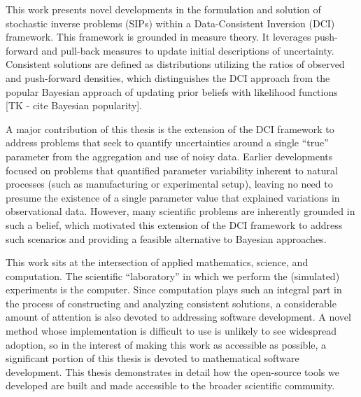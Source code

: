 This work presents novel developments in the formulation and solution of stochastic inverse problems (SIPs) within a Data-Consistent Inversion (DCI) framework.
This framework is grounded in measure theory.
It leverages push-forward and pull-back measures to update initial descriptions of uncertainty.
Consistent solutions are defined as distributions utilizing the ratios of observed and push-forward densities, which distinguishes the DCI approach from the popular Bayesian approach of updating prior beliefs with likelihood functions [TK - cite Bayesian popularity].

A major contribution of this thesis is the extension of the DCI framework to address problems that seek to quantify uncertainties around a single ``true'' parameter from the aggregation and use of noisy data.
Earlier developments focused on problems that quantified parameter variability inherent to natural processes (such as manufacturing or experimental setup), leaving no need to presume the existence of a single parameter value that explained variations in observational data.
However, many scientific problems are inherently grounded in such a belief, which motivated this extension of the DCI framework to address such scenarios and providing a feasible alternative to Bayesian approaches.

This work sits at the intersection of applied mathematics, science, and computation.
The scientific ``laboratory'' in which we perform the (simulated) experiments is the computer.
Since computation plays such an integral part in the process of constructing and analyzing consistent solutions, a considerable amount of attention is also devoted to addressing software development.
A novel method whose implementation is difficult to use is unlikely to see widespread adoption, so in the interest of making this work as accessible as possible, a significant portion of this thesis is devoted to mathematical software development.
This thesis demonstrates in detail how the open-source tools we developed are built and made accessible to the broader scientific community.
